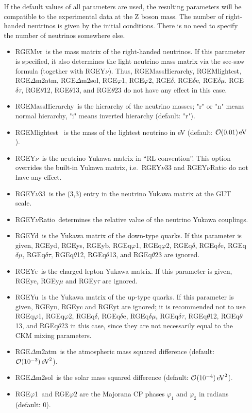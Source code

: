 \documentclass[10pt,a4paper,twoside]{scrartcl}
\begin{document}
If the default values of all parameters are used, the resulting parameters will
be compatible to the experimental data at the Z boson mass. The number of right-handed neutrinos is given by the initial conditions. There
is no need to specify the number of neutrinos somewhere else.
\begin{itemize}
\item RGEM$\nu$r\ is the mass matrix of the right-handed neutrinos.
  If this parameter is specified, it also determines the light neutrino
  mass matrix via the see-saw formula (together with RGEY$\nu$).  Thus,
  RGEMassHierarchy, RGEMlightest, RGE$\Delta$m2atm, RGE$\Delta$m2sol,
  RGE$\varphi$1, RGE$\varphi$2, RGE$\delta$, RGE$\delta$e,
  RGE$\delta\mu$, RGE$\delta\tau$, RGE$\theta$12, RGE$\theta$13, and
  RGE$\theta$23 do not have any effect in this case.
  
\item RGEMassHierarchy\ is the hierarchy of the neutrino masses; "r" or "n"
  means normal hierarchy, "i" means inverted hierarchy (default: "r").
  
\item RGEMlightest \ is the mass of the lightest neutrino in eV (default: $\mathcal{O}(0.01)
  \,\mathrm{eV}$).
  
\item RGEY$\nu$\ is the neutrino Yukawa matrix in ``RL convention''. This option overrides the
  built-in Yukawa matrix, i.e.\ RGEY$\nu33$ and RGEY$\nu$Ratio do not have any
  effect. 
  
\item RGEY$\nu$33\ is the (3,3) entry in the neutrino Yukawa matrix at the GUT
  scale.
\item RGEY$\nu$Ratio\ determines the relative value of the neutrino Yukawa couplings.
\item RGEYd\ is the Yukawa matrix of the down-type quarks.
  If this parameter is given, RGEyd, RGEys, RGEyb, RGEq$\varphi$1,
  RGEq$\varphi$2, RGEq$\delta$, RGEq$\delta$e, RGEq$\delta\mu$,
  RGEq$\delta\tau$, RGEq$\theta$12, RGEq$\theta$13, and RGEq$\theta$23
  are ignored.
  
\item RGEYe\ is the charged lepton Yukawa matrix.
  If this parameter is given, RGEye, RGEy$\mu$ and RGEy$\tau$ are
  ignored.
  
\item RGEYu\ is the Yukawa matrix of the up-type quarks.
  If this parameter is given, RGEyu, RGEyc and RGEyt are ignored;
  it is recommended not to use RGEq$\varphi$1, RGEq$\varphi$2,
  RGEq$\delta$, RGEq$\delta$e, RGEq$\delta\mu$, RGEq$\delta\tau$,
  RGEq$\theta$12, RGEq$\theta$13, and RGEq$\theta$23 in this case, since
  they are not necessarily equal to the CKM mixing parameters.
\item RGE$\Delta$m2atm\ is the atmospheric mass squared difference (default: $ \mathcal{O}(10^{-3}) \,\mathrm{eV}^2$).
\item RGE$\Delta$m2sol\ is the solar mass squared difference (default:
  $\mathcal{O}(10^{-4}) \,\mathrm{eV}^2$).
\item RGE$\varphi$1\ and RGE$\varphi2$ are the Majorana CP phases $\varphi_1$ and $\varphi_2$ in radians (default: $0$).
  

\end{itemize}
\end{document}
